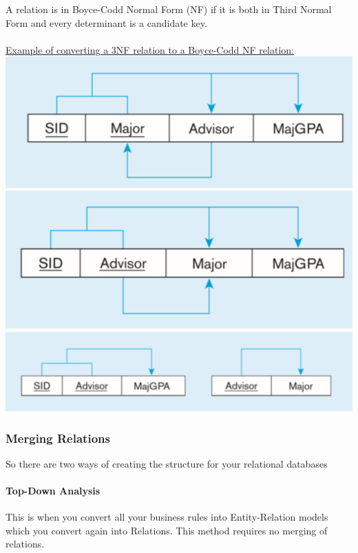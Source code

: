 \documentclass[12pt]{article}
\begin{document}
A relation is in Boyce-Codd Normal Form (NF) if it is both in Third Normal Form and every determinant is a candidate key.\\
\\
\underline{Example of converting a 3NF relation to a Boyce-Codd NF relation:}\\
\includegraphics[scale=0.7]{lec6-5}\\
\includegraphics[scale=0.7]{lec6-6}\\
\includegraphics[scale=0.7]{lec6-7}

\subsubsection{Merging Relations}

So there are two ways of creating the structure for your relational databases

\paragraph{Top-Down Analysis} This is when you convert all your business rules into Entity-Relation models which you convert again into Relations. This method requires no merging of relations.
\end{document}
